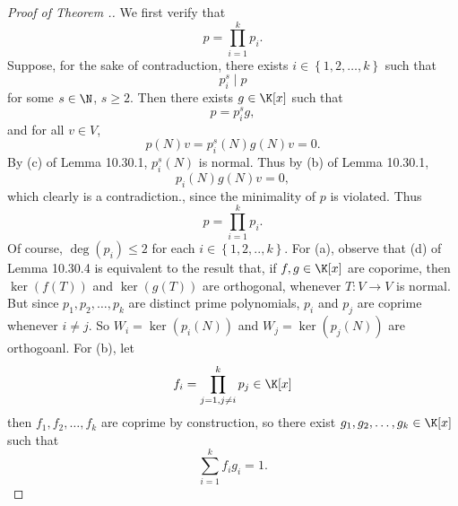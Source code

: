 \documentclass[linearalgebra]{subfiles}
\begin{document}

    \begin{proof}[Proof of Theorem \thechapter.\thestcounter]
        We first verify that
        \begin{equation*}
            p = \prod^{k}_{i=1} p_i.
        \end{equation*}
        Suppose, for the sake of contraduction, there exists $i\in\left\lbrace 1,2,\ldots,k \right\rbrace$ such that
        \begin{equation*}
            p_i^s \mid p
        \end{equation*}
        for some $s\in\N$, $s\geq 2$. Then there exists $g\in\K[x]$ such that
        \begin{equation*}
            p = p_i^sg,
        \end{equation*}
        and for all $v\in V$,
        \begin{equation*}
            p(N)v = p_i^s(N)g(N)v = 0.
        \end{equation*}
        By (c) of Lemma 10.30.1, $p_i^s(N)$ is normal. Thus by (b) of Lemma 10.30.1, 
        \begin{equation*}
            p_i(N)g(N)v = 0,
        \end{equation*}
        which clearly is a contradiction., since the minimality of $p$ is violated. Thus
        \begin{equation*}
            p = \prod^{k}_{i=1} p_i.
        \end{equation*}
        Of course, $\deg\left( p_i \right) \leq 2$ for each $i\in\left\lbrace 1,2,..,k \right\rbrace$. For (a), observe that (d) of Lemma 10.30.4 is equivalent to the result that, if $f,g\in\K[x]$ are coporime, then $\ker\left( f(T) \right)$ and $\ker\left( g(T) \right)$ are orthogonal, whenever $T:V\to V$ is normal. But since $p_1,p_2,\ldots,p_k$ are distinct prime polynomials, $p_i$ and $p_j$ are coprime whenever $i\neq j$. So $W_i = \ker\left( p_i(N) \right) $ and $W_j = \ker\left( p_j(N) \right) $ are orthogoanl. For (b), let
        \begin{equation*}
            f_i = \prod^{k}_{j=1, j\neq i} p_j\in\K[x]
        \end{equation*}
        then $f_1,f_2,\ldots,f_k$ are coprime by construction, so there exist $g_1,g_2,\ldots,g_k\in\K[x]$ such that
        \begin{equation*}
            \sum^{k}_{i=1} f_ig_i = 1.
        \end{equation*}

\end{proof}
\end{document}
